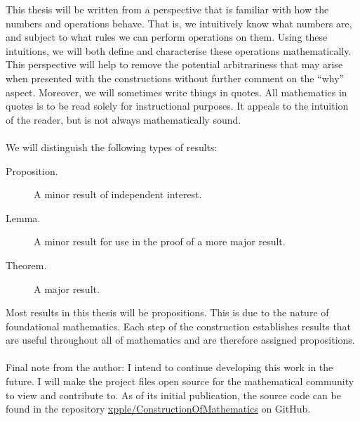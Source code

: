 \documentclass[../main.tex]{subfiles}
\begin{document}
This thesis will be written from a perspective that is familiar with how the numbers and operations behave. That is, we intuitively know what numbers are, and subject to what rules we can perform operations on them. Using these intuitions, we will both define and characterise these operations mathematically. This perspective will help to remove the potential arbitrariness that may arise when presented with the constructions without further comment on the ``why'' aspect. Moreover, we will sometimes write things in quotes. All mathematics in quotes is to be read solely for instructional purposes. It appeals to the intuition of the reader, but is not always mathematically sound. \\\\
We will distinguish the following types of results:
\begin{description}
    \item[Proposition.] A minor result of independent interest.
    \item[Lemma.] A minor result for use in the proof of a more major result.
    \item[Theorem.] A major result.
\end{description}
Most results in this thesis will be propositions. This is due to the nature of foundational mathematics. Each step of the construction establishes results that are useful throughout all of mathematics and are therefore assigned propositions. \\\\
Final note from the author: I intend to continue developing this work in the future. I will make the project files open source for the mathematical community to view and contribute to. As of its initial publication, the source code can be found in the repository \href{https://github.com/xpple/ConstructionOfMathematics}{xpple/ConstructionOfMathematics} on GitHub.
\end{document}
